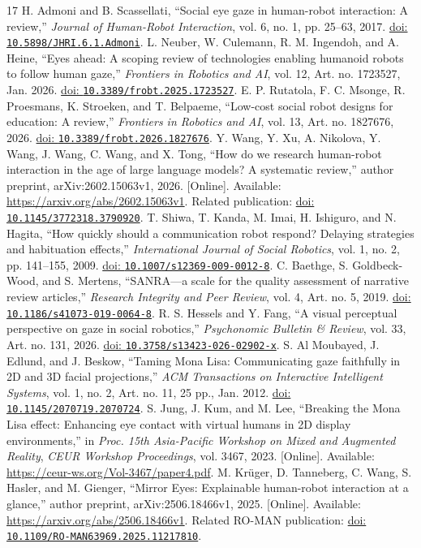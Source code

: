 \documentclass[journal]{IEEEtran}
\newcommand{\doi}[1]{\href{https://doi.org/#1}{doi: \nolinkurl{#1}}}
\begin{document}
\begin{thebibliography}{17}
 H. Admoni and B. Scassellati, ``Social eye gaze in human-robot interaction: A review,'' \emph{Journal of Human-Robot Interaction}, vol. 6, no. 1, pp. 25--63, 2017. \doi{10.5898/JHRI.6.1.Admoni}.
 L. Neuber, W. Culemann, R. M. Ingendoh, and A. Heine, ``Eyes ahead: A scoping review of technologies enabling humanoid robots to follow human gaze,'' \emph{Frontiers in Robotics and AI}, vol. 12, Art. no. 1723527, Jan. 2026. \doi{10.3389/frobt.2025.1723527}.
 E. P. Rutatola, F. C. Msonge, R. Proesmans, K. Stroeken, and T. Belpaeme, ``Low-cost social robot designs for education: A review,'' \emph{Frontiers in Robotics and AI}, vol. 13, Art. no. 1827676, 2026. \doi{10.3389/frobt.2026.1827676}.
 Y. Wang, Y. Xu, A. Nikolova, Y. Wang, J. Wang, C. Wang, and X. Tong, ``How do we research human-robot interaction in the age of large language models? A systematic review,'' author preprint, arXiv:2602.15063v1, 2026. [Online]. Available: \url{https://arxiv.org/abs/2602.15063v1}. Related publication: \doi{10.1145/3772318.3790920}.
 T. Shiwa, T. Kanda, M. Imai, H. Ishiguro, and N. Hagita, ``How quickly should a communication robot respond? Delaying strategies and habituation effects,'' \emph{International Journal of Social Robotics}, vol. 1, no. 2, pp. 141--155, 2009. \doi{10.1007/s12369-009-0012-8}.
 C. Baethge, S. Goldbeck-Wood, and S. Mertens, ``SANRA---a scale for the quality assessment of narrative review articles,'' \emph{Research Integrity and Peer Review}, vol. 4, Art. no. 5, 2019. \doi{10.1186/s41073-019-0064-8}.
 R. S. Hessels and Y. Fang, ``A visual perceptual perspective on gaze in social robotics,'' \emph{Psychonomic Bulletin \& Review}, vol. 33, Art. no. 131, 2026. \doi{10.3758/s13423-026-02902-x}.
 S. Al Moubayed, J. Edlund, and J. Beskow, ``Taming Mona Lisa: Communicating gaze faithfully in 2D and 3D facial projections,'' \emph{ACM Transactions on Interactive Intelligent Systems}, vol. 1, no. 2, Art. no. 11, 25 pp., Jan. 2012. \doi{10.1145/2070719.2070724}.
 S. Jung, J. Kum, and M. Lee, ``Breaking the Mona Lisa effect: Enhancing eye contact with virtual humans in 2D display environments,'' in \emph{Proc. 15th Asia-Pacific Workshop on Mixed and Augmented Reality}, \emph{CEUR Workshop Proceedings}, vol. 3467, 2023. [Online]. Available: \url{https://ceur-ws.org/Vol-3467/paper4.pdf}.
 M. Kr\"uger, D. Tanneberg, C. Wang, S. Hasler, and M. Gienger, ``Mirror Eyes: Explainable human-robot interaction at a glance,'' author preprint, arXiv:2506.18466v1, 2025. [Online]. Available: \url{https://arxiv.org/abs/2506.18466v1}. Related RO-MAN publication: \doi{10.1109/RO-MAN63969.2025.11217810}.

\end{thebibliography}
\end{document}
